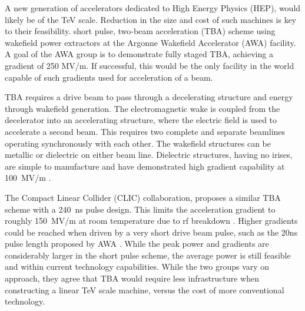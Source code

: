  \label{sec:motivation}

A new generation of accelerators dedicated to High Energy Physics
(HEP), would likely be of the TeV scale. Reduction in the size and cost
of such machines is key to their feasibility. 
short pulse, two-beam acceleration (TBA) scheme using 
wakefield power extractors at the Argonne Wakefield Accelerator (AWA) facility. 
A goal of the AWA group is to demonstrate fully staged TBA, 
achieving a gradient of 250 MV/m. If successful, this would
be the only facility in the world capable of such gradients used for
acceleration of a beam.

TBA requires a drive beam to pass through a decelerating structure and
 energy through wakefield generation. The electromagnetic wake
is coupled from the decelerator into an accelerating structure, where
the electric field is used to accelerate a second beam. 
This requires two complete and separate beamlines 
operating synchronously with each other.  
The wakefield structures can be metallic or dielectric on either beam line. 
Dielectric structures, having no irises, are simple to manufacture and have demonstrated
high gradient capability at \SI{100}{MV/m} \cite{WeiPaper}. 

The Compact Linear Collider (CLIC) collaboration, proposes a similar TBA scheme with
a \SI{240}{ns} pulse design. This limits the acceleration gradient
to roughly \SI{150}{MV/m} at room temperature due to rf breakdown \cite{CLICdesignReport}.
Higher gradients could be reached when driven by a very short drive
beam pulse, such as the 20ns pulse length proposed by AWA \cite{WeiPaper}. 
While the peak power and gradients are considerably larger in the short pulse scheme, 
the average power is still feasible and within current technology capabilities.
While the two groups vary on approach, they agree that TBA would 
require less infrastructure when constructing a linear TeV scale machine, 
versus the cost of more conventional technology. 

